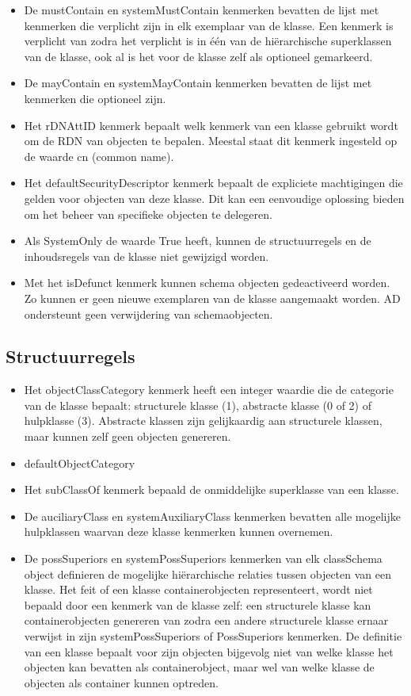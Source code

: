\begin{itemize}
	\item De mustContain en systemMustContain kenmerken bevatten de lijst
		met kenmerken die verplicht zijn in elk exemplaar van de klasse.
		Een kenmerk is verplicht van zodra het verplicht is in één van
		de hiërarchische superklassen van de klasse, ook al is het voor
		de klasse zelf als optioneel gemarkeerd.
	\item De mayContain en systemMayContain kenmerken bevatten de lijst met
		kenmerken die optioneel zijn.
	\item Het rDNAttID kenmerk bepaalt welk kenmerk van een klasse gebruikt
		wordt om de RDN van objecten te bepalen. Meestal staat dit
		kenmerk ingesteld op de waarde cn (common name).
	\item Het defaultSecurityDescriptor kenmerk bepaalt de expliciete
		machtigingen die gelden voor objecten van deze klasse. Dit kan
		een eenvoudige oplossing bieden om het beheer van specifieke
		objecten te delegeren.
	\item Als SystemOnly de waarde True heeft, kunnen de structuurregels en
		de inhoudsregels van de klasse niet gewijzigd worden.
	\item Met het isDefunct kenmerk kunnen schema objecten gedeactiveerd
		worden. Zo kunnen er geen nieuwe exemplaren van de klasse
		aangemaakt worden. AD ondersteunt geen verwijdering van
		schemaobjecten.
\end{itemize}

\subsection{Structuurregels}
\begin{itemize}
	\item Het objectClassCategory kenmerk heeft een integer waardie die de
		categorie van de klasse bepaalt: structurele klasse (1),
		abstracte klasse (0 of 2) of hulpklasse (3). Abstracte klassen
		zijn gelijkaardig aan structurele klassen, maar kunnen zelf geen
		objecten genereren.
	\item defaultObjectCategory
	\item Het subClassOf kenmerk bepaald de onmiddelijke superklasse van een
		klasse.
	\item De auciliaryClass en systemAuxiliaryClass kenmerken bevatten alle
		mogelijke hulpklassen waarvan deze klasse kenmerken kunnen
		overnemen.
	\item De possSuperiors en systemPossSuperiors kenmerken van elk
		classSchema object definieren de mogelijke hiërarchische
		relaties tussen objecten van een klasse. Het feit of een klasse
		containerobjecten representeert, wordt niet bepaald door een
		kenmerk van de klasse zelf: een structurele klasse kan
		containerobjecten genereren van zodra een andere structurele
		klasse ernaar verwijst in zijn systemPossSuperiors of
		PossSuperiors kenmerken. De definitie van een klasse bepaalt
		voor zijn objecten bijgevolg niet van welke klasse het objecten
		kan bevatten als containerobject, maar wel van welke klasse de
		objecten als container kunnen optreden.
\end{itemize}

